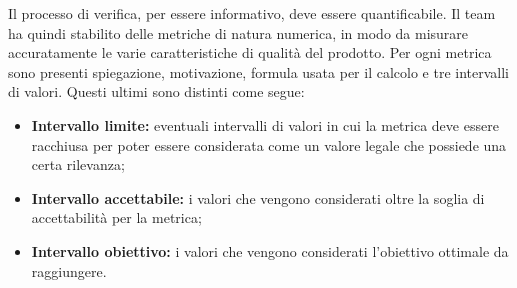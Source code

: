 Il processo di verifica, per essere informativo, deve essere quantificabile. Il team ha quindi stabilito delle metriche di natura numerica, in modo da misurare accuratamente le varie caratteristiche di qualità del prodotto. Per ogni metrica sono presenti  spiegazione, motivazione, formula usata per il calcolo e tre intervalli di valori. Questi ultimi sono distinti come segue:
\begin{itemize}
	\item {\textbf{Intervallo limite:} eventuali intervalli di valori in cui la metrica deve essere racchiusa per poter essere considerata come un valore legale che possiede una certa rilevanza;}
	\item {\textbf{Intervallo accettabile:} i valori che vengono considerati oltre la soglia di accettabilità per la metrica;}
	\item {\textbf{Intervallo obiettivo:} i valori che vengono considerati l'obiettivo ottimale da raggiungere.}
\end{itemize}
\pagebreak
